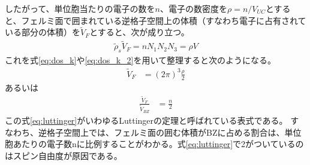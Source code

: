 \documentclass[uplatex,dvipdfmx]{jsarticle}
\begin{document}
	したがって、単位胞当たりの電子の数を$n$、電子の数密度を$\rho = n/V_{UC}$とすると、フェルミ面で囲まれている逆格子空間上の体積（すなわち電子に占有されている部分の体積）を$\tilde{V}_F$とすると、次が成り立つ。
	\begin{align}
		\tilde{\rho}_s\tilde{V}_F = nN_1N_2N_3 = \rho V 
	\end{align}
	これを式\eqref{eq:dos_k}や\eqref{eq:dos_k_2}を用いて整理すると次のようになる。
	\begin{align}
		\tilde{V}_F &= (2\pi)^3 \frac{\rho}{2}
	\end{align}
	あるいは
	\begin{align}
		\frac{\tilde{V}_F}{\tilde{V}_{BZ}} &= \frac{n}{2} \label{eq:luttinger}
	\end{align}
	この式\eqref{eq:luttinger}がいわゆるLuttingerの定理と呼ばれている表式である。
	すなわち、逆格子空間上では、フェルミ面の囲む体積がBZに占める割合は、単位胞あたりの電子数nに比例することがわかる。式\eqref{eq:luttinger}で2がついているのはスピン自由度が原因である。
\end{document}
